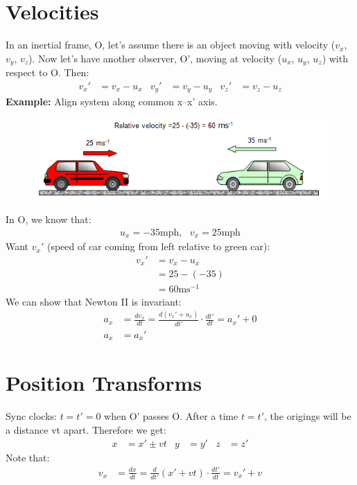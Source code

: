 \documentclass[a4paper, 11pt, normalem]{report}
\begin{document}
\section{Velocities}
In an inertial frame, O, let's assume there is an object moving with velocity ($v_{x}$, $v_{y}$, $v_{z}$).
Now let's have another observer, O', moving at velocity ($u_{x}$, $u_{y}$, $u_{z}$) with respect to O.
Then:
\begin{align}
    v_{x}' &= v_{x} - u_{x} & v_{y}' &= v_{y} - u_{y} & v_{z}' &= v_{z} - u_{z}
\end{align}
\textbf{Example:} Align system along common x--x' axis.
\begin{figure}[H]
    \centering
    \includegraphics{Cars.png}
\end{figure}
In O, we know that:
\begin{align}
    u_{x} = -35\text{mph},~~~v_{x} = 25\text{mph}
\end{align}
Want $v_{x}'$ (speed of car coming from left relative to green car):
\begin{align}
    v_{x}' &= v_{x} - u_{x} \\
           &= 25 - (-35) \\
           &= 60\text{ms}^{-1}
\end{align}
We can show that Newton II is invariant:
\begin{align}
    a_{x} &= \frac{dv_{x}}{dt} = \frac{d(v_{x}' + u_{x})}{dt'}\cdot \frac{dt'}{dt} = a_{x}' + 0 \\
    a_{x} &= a_{x}'
\end{align}

\section{Position Transforms}
Sync clocks: $t = t' = 0$ when O' passes O.
After a time $t = t'$,  the origings will be a distance vt apart.
Therefore we get:
\begin{align}
    x &= x' \pm vt & y &= y' & z &= z'
\end{align}
Note that:
\begin{align}
    v_{x} &= \frac{dx}{dt} = \frac{d}{dt'}(x' + vt)\cdot\frac{dt'}{dt} = v_{x}' + v
\end{align}
\end{document}
